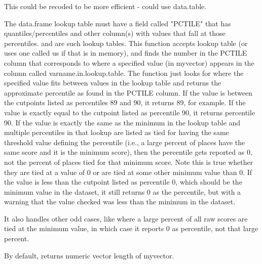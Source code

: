 \documentclass[a4paper]{book}
\begin{document}
\begin{Details}\relax
This could be recoded to be more efficient - could use data.table.

The data.frame lookup table must have a field called "PCTILE" that has quantiles/percentiles
and other column(s) with values that fall at those percentiles.
 and  are such lookup tables.
This function accepts lookup table (or uses one called us if that is in memory), and
finds the number in the PCTILE column that corresponds to where a specified value
(in myvector) appears in the column called varname.in.lookup.table.
The function just looks for where the specified value fits between values in the lookup table
and returns the approximate percentile as found in the PCTILE column.
If the value is between the cutpoints listed as
percentiles 89 and 90, it returns 89, for example.
If the value is exactly equal to the cutpoint listed as percentile 90,
it returns percentile 90.
If the value is exactly the same as the minimum in the lookup table and multiple percentiles
in that lookup are listed as tied for having the same threshold value defining the percentile
(i.e., a large percent of places have the same score and it is the minimum score),
then the percentile gets reported as 0,
not the percent of places tied for that minimum score. Note this is true whether they are
tied at a value of 0 or are tied at some other minimum value than 0.
If the value is less than the cutpoint listed as percentile 0,
which should be the minimum value in the dataset,
it still returns 0 as the percentile, but with a warning that
the value checked was less than the minimum in the dataset.

It also handles other odd cases, like where a large percent of all raw scores are tied at
the minimum value, in which case it reports 0 as percentile, not that large percent.
\end{Details}
%
\begin{Value}
By default, returns numeric vector length of myvector.
\end{Value}
%
\end{document}
